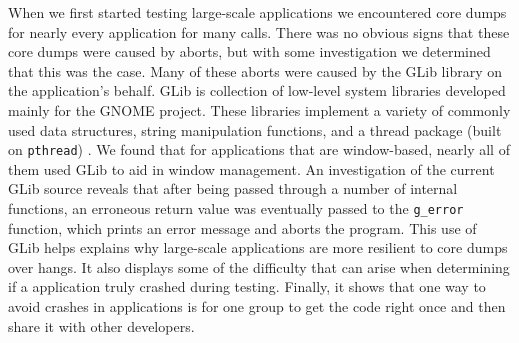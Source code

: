 When we first started testing large-scale applications we encountered core dumps for nearly every application for many calls. There was no obvious signs that these core dumps were caused by aborts, but with some investigation we determined that this was the case. Many of these aborts were caused by the GLib library on the application's behalf. GLib is collection of low-level system libraries developed mainly for the GNOME project. These libraries implement a variety of commonly used data structures, string manipulation functions, and a thread package (built on \texttt{pthread}) \cite{glibman}. We found that for applications that are window-based, nearly all of them used GLib to aid in window management. An investigation of the current GLib source reveals that after being passed through a number of internal functions, an erroneous return value was eventually passed to the \texttt{g\_error} function, which prints an error message and aborts the program. This use of GLib helps explains why large-scale applications are more resilient to core dumps over hangs. It also displays some of the difficulty that can arise when determining if a application truly crashed during testing. Finally, it shows that one way to avoid crashes in applications is for one group to get the code right once and then share it with other developers.



